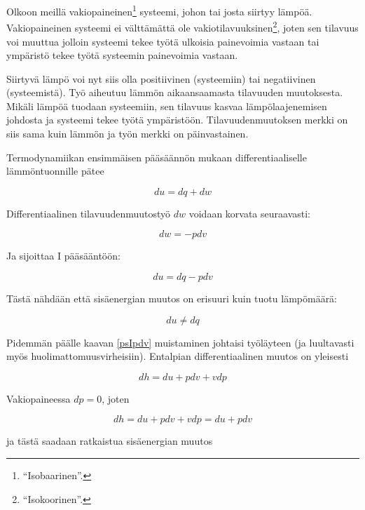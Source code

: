 \documentclass[12pt,a4paper,finnish]{book}
\begin{document}
Olkoon meillä vakiopaineinen\footnote{``Isobaarinen''.} systeemi, johon tai josta siirtyy lämpöä. Vakiopaineinen systeemi 
ei välttämättä ole vakiotilavuuksinen\footnote{``Isokoorinen''.}, joten sen tilavuus voi muuttua jolloin systeemi tekee 
työtä ulkoisia painevoimia vastaan tai ympäristö tekee työtä systeemin painevoimia vastaan. 

Siirtyvä lämpö voi nyt siis 
olla positiivinen (systeemiin) tai negatiivinen (systeemistä). Työ aiheutuu lämmön aikaansaamasta tilavuuden muutoksesta. 
Mikäli lämpöä tuodaan systeemiin, sen tilavuus kasvaa lämpölaajenemisen johdosta ja systeemi tekee työtä ympäristöön. 
Tilavuudenmuutoksen merkki on siis sama kuin lämmön ja työn merkki on päinvastainen.

Termodynamiikan ensimmäisen pääsäännön mukaan differentiaaliselle lämmöntuonnille pätee

\begin{equation}
 du = dq + dw
\end{equation}

Differentiaalinen tilavuudenmuutostyö $dw$ voidaan korvata seuraavasti:

\begin{equation}
 dw = -pdv
\end{equation}

Ja sijoittaa I pääsääntöön:

\begin{equation}
\label{psIpdv}
 du = dq - pdv
\end{equation}

Tästä nähdään että sisäenergian muutos on erisuuri kuin tuotu lämpömäärä:

\begin{equation}
 du \neq dq
\end{equation}

Pidemmän päälle kaavan \ref{psIpdv} muistaminen johtaisi työläyteen (ja luultavasti myös huolimattomuusvirheisiin). Entalpian 
differentiaalinen muutos on yleisesti

\begin{equation}
 dh = du + pdv + vdp
\end{equation}

Vakiopaineessa $dp = 0$, joten

\begin{equation}
 dh = du + pdv + vdp = du + pdv 
\end{equation}

ja tästä saadaan ratkaistua sisäenergian muutos
\end{document}
